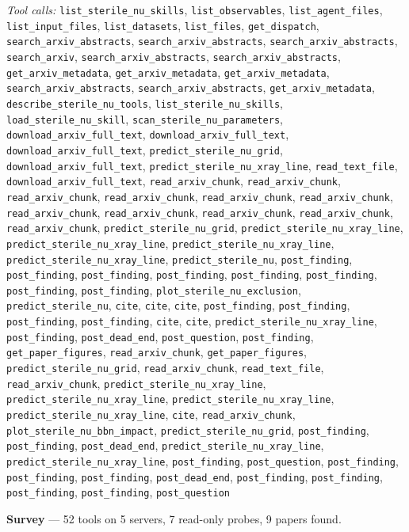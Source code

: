 \documentclass[11pt,a4paper]{article}
\begin{document}
\textit{Tool calls:} \texttt{list\_sterile\_nu\_skills}, \texttt{list\_observables}, \texttt{list\_agent\_files}, \texttt{list\_input\_files}, \texttt{list\_datasets}, \texttt{list\_files}, \texttt{get\_dispatch}, \texttt{search\_arxiv\_abstracts}, \texttt{search\_arxiv\_abstracts}, \texttt{search\_arxiv\_abstracts}, \texttt{search\_arxiv}, \texttt{search\_arxiv\_abstracts}, \texttt{search\_arxiv\_abstracts}, \texttt{get\_arxiv\_metadata}, \texttt{get\_arxiv\_metadata}, \texttt{get\_arxiv\_metadata}, \texttt{search\_arxiv\_abstracts}, \texttt{search\_arxiv\_abstracts}, \texttt{get\_arxiv\_metadata}, \texttt{describe\_sterile\_nu\_tools}, \texttt{list\_sterile\_nu\_skills}, \texttt{load\_sterile\_nu\_skill}, \texttt{scan\_sterile\_nu\_parameters}, \texttt{download\_arxiv\_full\_text}, \texttt{download\_arxiv\_full\_text}, \texttt{download\_arxiv\_full\_text}, \texttt{predict\_sterile\_nu\_grid}, \texttt{download\_arxiv\_full\_text}, \texttt{predict\_sterile\_nu\_xray\_line}, \texttt{read\_text\_file}, \texttt{download\_arxiv\_full\_text}, \texttt{read\_arxiv\_chunk}, \texttt{read\_arxiv\_chunk}, \texttt{read\_arxiv\_chunk}, \texttt{read\_arxiv\_chunk}, \texttt{read\_arxiv\_chunk}, \texttt{read\_arxiv\_chunk}, \texttt{read\_arxiv\_chunk}, \texttt{read\_arxiv\_chunk}, \texttt{read\_arxiv\_chunk}, \texttt{read\_arxiv\_chunk}, \texttt{read\_arxiv\_chunk}, \texttt{predict\_sterile\_nu\_grid}, \texttt{predict\_sterile\_nu\_xray\_line}, \texttt{predict\_sterile\_nu\_xray\_line}, \texttt{predict\_sterile\_nu\_xray\_line}, \texttt{predict\_sterile\_nu\_xray\_line}, \texttt{predict\_sterile\_nu}, \texttt{post\_finding}, \texttt{post\_finding}, \texttt{post\_finding}, \texttt{post\_finding}, \texttt{post\_finding}, \texttt{post\_finding}, \texttt{post\_finding}, \texttt{post\_finding}, \texttt{plot\_sterile\_nu\_exclusion}, \texttt{predict\_sterile\_nu}, \texttt{cite}, \texttt{cite}, \texttt{cite}, \texttt{post\_finding}, \texttt{post\_finding}, \texttt{post\_finding}, \texttt{post\_finding}, \texttt{cite}, \texttt{cite}, \texttt{predict\_sterile\_nu\_xray\_line}, \texttt{post\_finding}, \texttt{post\_dead\_end}, \texttt{post\_question}, \texttt{post\_finding}, \texttt{get\_paper\_figures}, \texttt{read\_arxiv\_chunk}, \texttt{get\_paper\_figures}, \texttt{predict\_sterile\_nu\_grid}, \texttt{read\_arxiv\_chunk}, \texttt{read\_text\_file}, \texttt{read\_arxiv\_chunk}, \texttt{predict\_sterile\_nu\_xray\_line}, \texttt{predict\_sterile\_nu\_xray\_line}, \texttt{predict\_sterile\_nu\_xray\_line}, \texttt{predict\_sterile\_nu\_xray\_line}, \texttt{cite}, \texttt{read\_arxiv\_chunk}, \texttt{plot\_sterile\_nu\_bbn\_impact}, \texttt{predict\_sterile\_nu\_grid}, \texttt{post\_finding}, \texttt{post\_finding}, \texttt{post\_dead\_end}, \texttt{predict\_sterile\_nu\_xray\_line}, \texttt{predict\_sterile\_nu\_xray\_line}, \texttt{post\_finding}, \texttt{post\_question}, \texttt{post\_finding}, \texttt{post\_finding}, \texttt{post\_finding}, \texttt{post\_dead\_end}, \texttt{post\_finding}, \texttt{post\_finding}, \texttt{post\_finding}, \texttt{post\_finding}, \texttt{post\_question}\par
\textbf{Survey} --- 52 tools on 5 servers, 7 read-only probes, 9 papers found.
\end{document}
